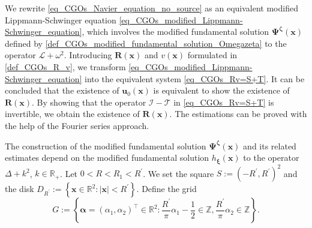 \documentclass[11pt,reqno,oneside]{amsart}
\theoremstyle{definition}
\theoremstyle{remark}
\numberwithin{equation}{section}
\numberwithin{equation}{section}
\theoremstyle{remark}
\begin{document}
We rewrite \eqref{eq_CGOs_Navier_equation_no_source} as an equivalent modified Lippmann-Schwinger equation \eqref{eq_CGOs_modified_Lippmann-Schwinger_equation}, which involves the modified fundamental solution $ \bm{\Psi}^{\bm{\zeta}}\left(\mathbf{x}\right) $ defined by \eqref{def_CGOs_modified_fundamental_solution_Omegazeta} to the operator $ \mathcal{L}+\omega^2 $. Introducing $ \mathbf{R}\left(\mathbf{x}\right) $ and $ v\left(\mathbf{x}\right) $ formulated in \eqref{def_CGOs_R_v}, we transform \eqref{eq_CGOs_modified_Lippmann-Schwinger_equation} into the equivalent system \eqref{eq_CGOs_Rv=S+T}. It can be concluded that  the existence of  $ \mathbf{u}_0\left(\mathbf{x}\right) $  is equivalent to show the existence of $\mathbf{R}\left(\mathbf{x}\right)$. By showing that the operator $ \mathcal{I} - \mathcal{T} $ in \eqref{eq_CGOs_Rv=S+T} is invertible, we obtain the existence of $\mathbf{R}\left(\mathbf{x}\right)$. The estimations can be proved with the help of the Fourier series approach.

The construction of the modified fundamental solution $ \bm{\Psi}^{\bm{\zeta}}\left(\mathbf{x}\right) $ and its related estimates depend on the modified fundamental solution $ h_{\bm{\xi}}\left(\mathbf{x}\right) $ to the operator $ \Delta + k^2 $, $ k\in\mathbb{R}_+ $. Let $ 0 < R < R_1 < R^{\prime} $. We set the square $ S := \left(-R^{\prime}, R^{\prime}\right)^2 $ and the disk $ D_{R^{\prime}}:=\left\{\mathbf{x} \in \mathbb{R}^2:\left| \mathbf{x} \right|< R^{\prime}\right\} $. Define the grid 
$$ G := \left\{ \bm{\alpha} = \left(\alpha_1, \alpha_2\right)^{\top} \in \mathbb{R}^2: \frac{R^{\prime}}{\pi} \alpha_1-\frac{1}{2} \in \mathbb{Z}, \frac{R^{\prime}}{\pi} \alpha_2 \in \mathbb{Z}\right\}.$$
\end{document}
